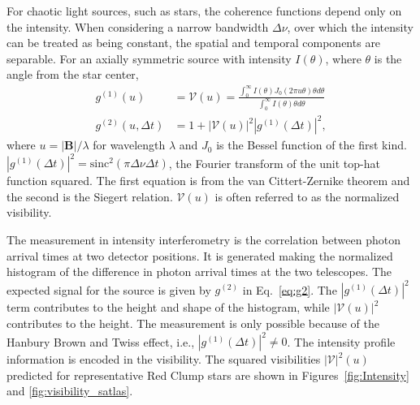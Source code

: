 \documentclass[linenumbers,trackchanges]{aastex701}
\begin{document}
For chaotic light sources, such as stars, the coherence functions
depend only on the intensity.  When considering a narrow bandwidth $\Delta \nu$, over which
the intensity can be treated as being constant, the spatial and temporal components are separable.
For an axially symmetric source with
intensity $I(\theta)$, where $\theta$ is the angle from the star center,
\begin{align}
    g^{(1)}(u) & = \mathcal{V}(u) = \frac{ \int_0^\infty{I(\theta) J_0(2 \pi u\theta) \theta d\theta}}
    {\int_0^\infty{I(\theta)\theta d\theta}} \\
    g^{(2)}(u, \Delta t) & = 1 + |\mathcal{V}(u)|^2 |g^{(1)}(\Delta t)|^2, \label{eq:g2}
\end{align}
where $u=|\mathbf{B}|/\lambda$ for wavelength
$\lambda$
and $J_0$ is the Bessel function of the first kind.
$|g^{(1)}(\Delta t)|^2 = \text{sinc}^2{(\pi\Delta\nu \Delta t)}$, the Fourier transform
of the unit top-hat function squared.
The first equation is from the van Cittert-Zernike theorem and the second is the Siegert relation.  $\mathcal{V}(u)$ is often referred to as the normalized visibility.


The measurement in intensity interferometry is the correlation between photon arrival times at two detector positions.  It is generated  making the normalized histogram of the difference in photon arrival times at the two telescopes.  The expected signal for
the source is given by $g^{(2)}$ in Eq.~\ref{eq:g2}.   The $|g^{(1)}(\Delta t)|^2$ term contributes to the height and shape of the histogram, while $|\mathcal{V}(u)|^2$ contributes to the height. 
The measurement is only possible because of the Hanbury Brown and
Twiss effect, i.e., $|g^{(1)}(\Delta t)|^2 \ne 0$.
The intensity profile information is encoded in the visibility.
The squared visibilities $|\mathcal{V}|^2(u) $ predicted for representative Red Clump stars are shown in Figures~\ref{fig:Intensity} and \ref{fig:visibility_satlas}.
\end{document}
